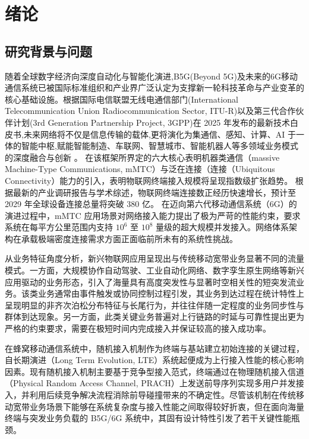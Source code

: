 \chapter{绪论}
\label{chapter1:introduction}

\section{研究背景与问题}
\label{sec:intro_background}


随着全球数字经济向深度自动化与智能化演进,B5G(Beyond 5G)及未来的6G移动通信系统已被国际标准组织和产业界广泛认定为支撑新一轮科技革命与产业变革的核心基础设施。根据国际电信联盟无线电通信部门(International Telecommunication Union Radiocommunication Sector, ITU-R)以及第三代合作伙伴计划(3rd Generation Partnership Project, 3GPP)在 2025 年发布的最新技术白皮书\cite{2023_ITUFramework},未来网络将不仅是信息传输的载体,更将演化为集通信、感知、计算、AI 于一体的智能中枢,赋能智能制造、车联网、智慧城市、智能机器人等多领域业务模式的深度融合与创新\cite{2023_6Groad, 2024_V2x} 。
在该框架所界定的六大核心表明机器类通信（massive Machine-Type Communications, mMTC）与泛在连接（连接（Ubiquitous Connectivity）能力的引入，表明物联网终端接入规模将呈现指数级扩张趋势。
根据最新的产业调研报告与学术综述\cite{2026_unsourced}，物联网终端连接数正经历快速增长，预计至 2029 年全球设备连接总量将突破 380 亿。
在迈向第六代移动通信系统（6G）的演进过程中，mMTC 应用场景对网络接入能力提出了极为严苛的性能约束，要求系统在每平方公里范围内支持 $10^6$ 至 $10^8$ 量级的超大规模并发接入。网络体系架构在承载极端密度连接需求方面正面临前所未有的系统性挑战。

从业务特征角度分析，新兴物联网应用呈现出与传统移动宽带业务显著不同的流量模式。一方面，大规模协作自动驾驶、工业自动化网络、数字孪生原生网络等新兴应用驱动的业务形态，引入了海量具有高度突发性与显著时空相关性的短突发流业务\cite{2018_V2Xwireless,20246_6GIndustrial,2025_NDTnetwork}。该类业务通常由事件触发或协同控制过程引发，其业务到达过程在统计特性上呈现明显的非齐次泊松分布特征与长尾行为，并往往伴随一定程度的业务同步性与群体到达现象。另一方面，此类关键业务普遍对上行链路的时延与可靠性提出更为严格的约束要求，需要在极短时间内完成接入并保证较高的接入成功率。

在蜂窝移动通信系统中，随机接入机制作为终端与基站建立初始连接的关键过程，自长期演进（Long Term Evolution, LTE）系统起便成为上行接入性能的核心影响因素。现有随机接入机制主要基于竞争型接入范式，终端通过在物理随机接入信道（Physical Random Access Channel, PRACH）上发送前导序列实现多用户并发接入，并利用后续竞争解决流程消除前导碰撞带来的不确定性\cite{2013_4gLTERA,3GPP_TS36321}。尽管该机制在传统移动宽带业务场景下能够在系统复杂度与接入性能之间取得较好折衷，但在面向海量终端与突发业务负载的 B5G/6G 系统中，其固有设计特性引发了若干关键性能瓶颈。

